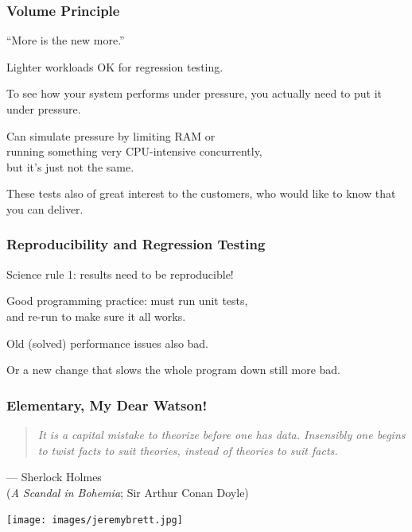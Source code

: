 \begin{frame}
\frametitle{Volume Principle}

\begin{changemargin}{2cm}
``More is the new more.'' 

Lighter workloads OK for regression testing. 

To see how your system performs under pressure, you actually need to put it under pressure. 

Can simulate pressure by limiting RAM or\\ running something very CPU-intensive concurrently,\\
but it's just not the same.

These tests also  of great interest to the customers, who would like to know that you can deliver. 
\end{changemargin}

\end{frame}



\begin{frame}
\frametitle{Reproducibility and Regression Testing}


\begin{changemargin}{2cm}
Science rule 1: results need to be reproducible!

Good programming practice: must run unit tests,\\
and re-run to make sure it all works. 

Old (solved) performance issues also bad.

Or a new change that slows the whole program down still more bad.
\end{changemargin}
\end{frame}



\begin{frame}
\frametitle{Elementary, My Dear Watson!}


\begin{changemargin}{1cm}
\begin{quote}
\textit{It is a capital mistake to theorize before one has data. Insensibly one begins to twist facts to suit theories, instead of theories to suit facts.}
\end{quote}
\hfill --- Sherlock Holmes\\
\hfill (\textit{A Scandal in Bohemia}; Sir Arthur Conan Doyle)
\end{changemargin}

\begin{center}
	\texttt{[image: images/jeremybrett.jpg]}
\end{center}

\end{frame}



